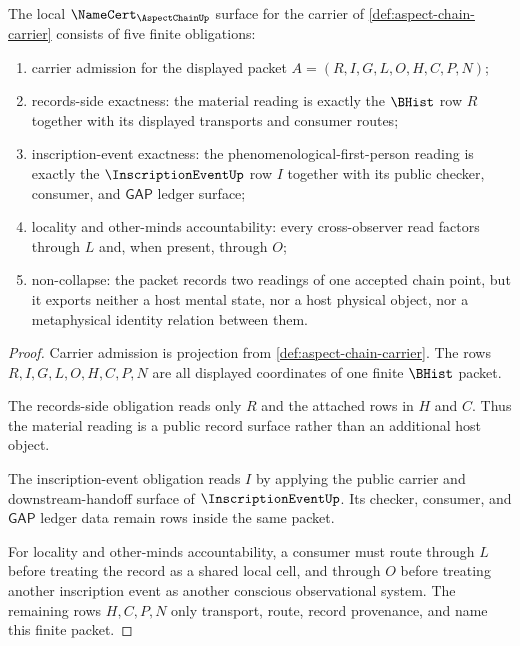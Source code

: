 \begin{theorem}
\label{thm:aspect-chain-namecert-obligations}
The local $\NameCert_{\AspectChainUp}$ surface for the carrier of \autoref{def:aspect-chain-carrier} consists of five finite obligations:
\begin{enumerate}
\item carrier admission for the displayed packet $A=(R,I,G,L,O,H,C,P,N)$;
\item records-side exactness: the material reading is exactly the $\BHist$ row $R$ together with its displayed transports and consumer routes;
\item inscription-event exactness: the phenomenological-first-person reading is exactly the $\InscriptionEventUp$ row $I$ together with its public checker, consumer, and $\mathsf{GAP}$ ledger surface;
\item locality and other-minds accountability: every cross-observer read factors through $L$ and, when present, through $O$;
\item non-collapse: the packet records two readings of one accepted chain point, but it exports neither a host mental state, nor a host physical object, nor a metaphysical identity relation between them.
\end{enumerate}
\end{theorem}
\begin{proof}
Carrier admission is projection from \autoref{def:aspect-chain-carrier}. The rows $R,I,G,L,O,H,C,P,N$ are all displayed coordinates of one finite $\BHist$ packet.

The records-side obligation reads only $R$ and the attached rows in $H$ and $C$. Thus the material reading is a public record surface rather than an additional host object.

The inscription-event obligation reads $I$ by applying the public carrier and downstream-handoff surface of $\InscriptionEventUp$. Its checker, consumer, and $\mathsf{GAP}$ ledger data remain rows inside the same packet.

For locality and other-minds accountability, a consumer must route through $L$ before treating the record as a shared local cell, and through $O$ before treating another inscription event as another conscious observational system. The remaining rows $H,C,P,N$ only transport, route, record provenance, and name this finite packet.
\end{proof}

